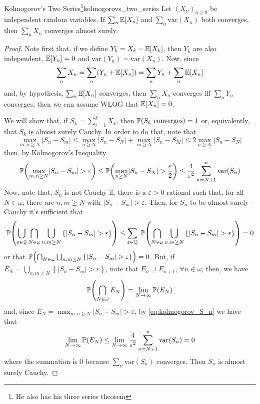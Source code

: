 \begin{lemma}{Kolmogorov's Two Series\footnote{He also has his three series theorem}}{kolmogorovs_two_series}
    Let $(X_n)_{n\geq0}$ be independent random variables. If $\sum_n\mathbb{E}[X_n]$ and $\sum_n\text{var}(X_n)$ both converges, then $\sum_n X_n$ converges almost surely.
\end{lemma}

\begin{proof}
    Note first that, if we define $Y_k=X_k-\mathbb{E}[X_k]$, then $Y_k$ are also independent, $\mathbb{E}[Y_n]=0$ and $\text{var}(Y_n)=\text{var}(X_n)$. Now, since
    $$\sum_n X_n=\sum_n(Y_n+\mathbb{E}[X_n])=\sum_n Y_n+\sum_n\mathbb{E}[X_n]$$
    and, by hypothesis, $\sum_n\mathbb{E}[X_n]$ converges, then $\sum_n X_n$ converges iff $\sum_n Y_n$ converges, then we can assume WLOG that $\mathbb{E}[X_n]=0$.

    We will show that, if $S_k=\sum_{i=1}^kX_k$, then $\mathbb{P}(S_k\text{ converges})=1$ or, equivalently, that $S_k$ is almost surely Cauchy. In order to do that, note that
    $$\max_{m,n\geq N}\lvert S_n-S_m\rvert\leq\max_{n\geq N}\lvert S_n-S_N\rvert+\max_{m\geq N}\lvert S_n-S_M\rvert\leq2\max_{n\geq N}\lvert S_n-S_N\rvert$$
    then, by Kolmogorov's Inequality
    \begin{equation}\label{eq:kolmogorov_S_n}
        \mathbb{P}{\left(\max_{m,n\geq N}\lvert S_n-S_m\rvert>\varepsilon\right)}\leq\mathbb{P}{\left(\max_{n\geq N}\lvert S_n-S_N\rvert>\frac\varepsilon2\right)}\leq\frac4{\varepsilon^2}\sum_{n=N+1}^n\text{var}(S_n)
    \end{equation}
    Now, note that, $S_n$ is not Cauchy if, there is a $\varepsilon>0$ rational such that, for all $N\in\omega$, there are $n,m\geq N$ with $\lvert S_n-S_m\rvert>\varepsilon$. Then, for $S_n$ to be almost surely Cauchy it's sufficient that
    $$\mathbb{P}{\left(\bigcup_{\varepsilon\in\mathbb{Q}}\bigcap_{N\in\omega}\bigcup_{n,m\geq N}\left\{\lvert S_n-S_m\rvert>\varepsilon\right\}\right)}\leq\sum_{\varepsilon
    \in\mathbb{Q}}\;\mathbb{P}{\left(\bigcap_{N\in\omega}\bigcup_{n,m\geq N}\left\{\lvert S_n-S_m\rvert>\varepsilon\right\}\right)}=0$$
    or that $\mathbb{P}{\left(\bigcap_{N\in\omega}\bigcup_{n,m\geq N}\left\{\lvert S_n-S_m\rvert>\varepsilon\right\}\right)}=0$. But, if $E_N=\bigcup_{n,m\geq N}\left\{\lvert S_n-S_m\rvert>\varepsilon\right\}$, note that $E_n\supseteq E_{n+1}$, $\forall n\in\omega$, then, we have
    $$\mathbb{P}{\left(\bigcap_{N\in\omega}E_N\right)}=\lim_{N\to\infty}\mathbb{P}(E_N)$$
    and, since $E_N=\max_{m,n\geq N}\lvert S_n-S_m\rvert>\varepsilon$, by \cref{eq:kolmogorov_S_n} we have that
    $$\lim_{N\to\infty}\mathbb{P}(E_N)\leq\lim_{N\to\infty}\frac4{\varepsilon^2}\sum_{n=N+1}^n\text{var}(S_n)=0$$
    where the summation is $0$ because $\sum_n\text{var}(S_n)$ converges. Then $S_n$ is almost surely Cauchy.
\end{proof}

